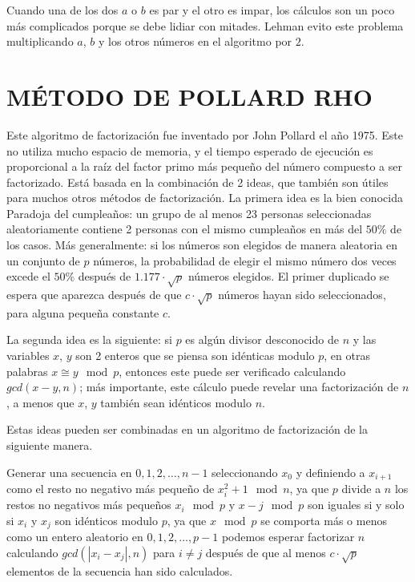     Cuando una de los dos $a$ o $b$ es par y el otro es impar, los cálculos son un poco más complicados porque se debe lidiar con mitades. Lehman evito este problema multiplicando $a$, $b$ y los otros números en el algoritmo por $2$. \citep{Lawrence1895}
    
    \section{MÉTODO DE POLLARD RHO}
    Este algoritmo de factorización fue inventado por John Pollard el año 1975. Este no utiliza mucho espacio de memoria, y el tiempo esperado de ejecución es proporcional a la raíz del factor primo más pequeño del número compuesto a ser factorizado. Está basada en la combinación de 2 ideas, que también son útiles para muchos otros métodos de factorización. La primera idea es la bien conocida Paradoja del cumpleaños: un grupo de al menos 23 personas seleccionadas aleatoriamente contiene 2 personas con el mismo cumpleaños en más del $50\%$ de los casos. Más generalmente: si los números son elegidos de manera aleatoria en un conjunto de $p$ números, la probabilidad de elegir el mismo número dos veces excede el $50\%$ después de $1.177\cdot\sqrt{p}$ números elegidos. El primer duplicado se espera que aparezca después de que $c\cdot\sqrt{p}$ números hayan sido seleccionados, para alguna pequeña constante $c$.

    La segunda idea es la siguiente: si $p$ es algún divisor desconocido de $n$ y las variables $x$, $y$ son 2 enteros que se piensa son idénticas modulo $p$, en otras palabras $x \cong y \mod p$, entonces este puede ser verificado calculando $gcd(x - y, n)$; más importante, este cálculo puede revelar una factorización de $n$, a menos que $x$, $y$ también sean idénticos modulo $n$.

    Estas ideas pueden ser combinadas en un algoritmo de factorización de la siguiente manera.

    Generar una secuencia en $0, 1, 2, \dots, n-1$ seleccionando $x_{0}$ y definiendo a $x_{i+1}$ como el resto no negativo más pequeño de $x^{2}_{i} + 1 \mod n$, ya que $p$ divide a $n$ los restos no negativos más pequeños $x_{i} \mod p$ y $x-{j} \mod p$ son iguales si y solo si $x_{i}$ y $x_{j}$ son idénticos modulo $p$, ya que $x \mod p$ se comporta más o menos como un entero aleatorio en $0, 1, 2, \dots, p-1$ podemos esperar factorizar $n$ calculando $gcd(|x_{i} - x_{j}|, n)$ para $i \not = j$ después de que al menos $c\cdot\sqrt{p}$ elementos de la secuencia han sido calculados. \citep{Pollard1975}

